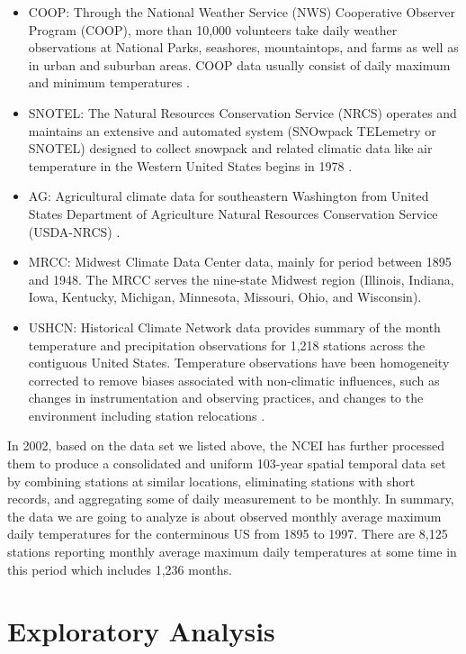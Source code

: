 \begin{itemize}
  \item COOP:
    Through the National Weather Service (NWS) Cooperative Observer Program 
    (COOP), more than 10,000 volunteers take daily weather observations at 
    National Parks, seashores, mountaintops, and farms as well as in urban and 
    suburban areas. COOP data usually consist of daily maximum and minimum 
    temperatures \cite{COOP}.
  \item SNOTEL:
    The Natural Resources Conservation Service (NRCS) operates and maintains an 
    extensive and automated system (SNOwpack TELemetry or SNOTEL) designed to
    collect snowpack and related climatic data like air temperature in the Western
    United States begins in 1978 \cite{SNOTEL}.
  \item AG:
    Agricultural climate data for southeastern Washington from United States
    Department of Agriculture Natural Resources Conservation Service (USDA-NRCS) 
    \cite{USDA}.
  \item MRCC:
    Midwest Climate Data Center data, mainly for period between 1895 and 1948. 
    The MRCC \cite{MRCC} serves the nine-state Midwest region (Illinois, Indiana, 
    Iowa, Kentucky, Michigan, Minnesota, Missouri, Ohio, and Wisconsin).
  \item USHCN:
    Historical Climate Network data provides summary of the month temperature and 
    precipitation observations for 1,218 stations across the contiguous United 
    States. Temperature observations have been homogeneity corrected to remove 
    biases associated with non-climatic influences, such as changes in 
    instrumentation and observing practices, and changes to the environment 
    including station relocations \cite{USHCN}.
\end{itemize}

In 2002, based on the data set we listed above, the NCEI has further
processed them to produce a consolidated and uniform 103-year spatial temporal
data set by combining stations at similar locations, eliminating stations with
short records, and aggregating some of daily measurement to be monthly.
In summary, the data we are going to analyze is about observed monthly average
maximum daily temperatures for the conterminous US from 1895 to 1997. There are
8,125 stations reporting monthly average maximum daily temperatures at some time
in this period which includes 1,236 months. 

\section{Exploratory Analysis}

